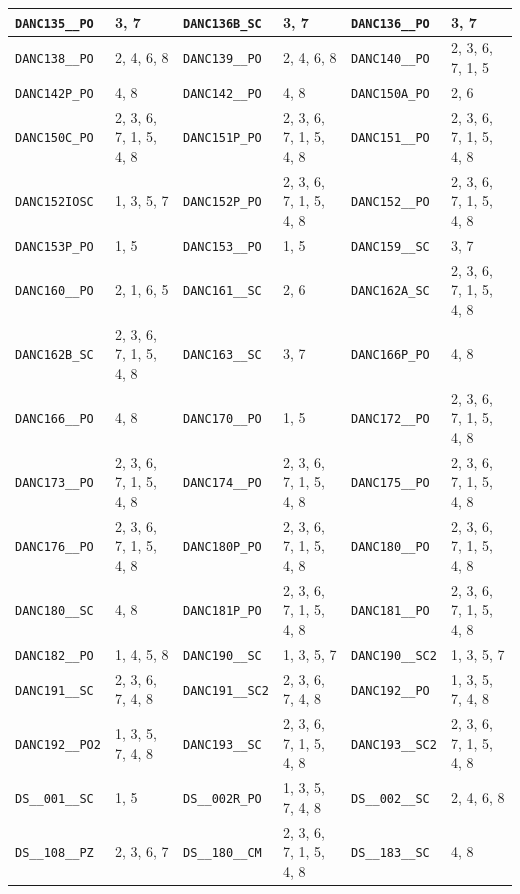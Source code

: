 \begin{longtable}{|l|l||l|l||l|l|}
    \verb|DANC135__PO| & 3, 7 & \verb|DANC136B_SC| & 3, 7 & \verb|DANC136__PO| & 3, 7\\\hline
    \verb|DANC138__PO| & 2, 4, 6, 8 & \verb|DANC139__PO| & 2, 4, 6, 8 & \verb|DANC140__PO| & 2, 3, 6, 7, 1, 5\\\hline
    \verb|DANC142P_PO| & 4, 8 & \verb|DANC142__PO| & 4, 8 & \verb|DANC150A_PO| & 2, 6\\\hline
    \verb|DANC150C_PO| & 2, 3, 6, 7, 1, 5, 4, 8 & \verb|DANC151P_PO| & 2, 3, 6, 7, 1, 5, 4, 8 & \verb|DANC151__PO| & 2, 3, 6, 7, 1, 5, 4, 8\\\hline
    \verb|DANC152IOSC| & 1, 3, 5, 7 & \verb|DANC152P_PO| & 2, 3, 6, 7, 1, 5, 4, 8 & \verb|DANC152__PO| & 2, 3, 6, 7, 1, 5, 4, 8\\\hline
    \verb|DANC153P_PO| & 1, 5 & \verb|DANC153__PO| & 1, 5 & \verb|DANC159__SC| & 3, 7\\\hline
    \verb|DANC160__PO| & 2, 1, 6, 5 & \verb|DANC161__SC| & 2, 6 & \verb|DANC162A_SC| & 2, 3, 6, 7, 1, 5, 4, 8\\\hline
    \verb|DANC162B_SC| & 2, 3, 6, 7, 1, 5, 4, 8 & \verb|DANC163__SC| & 3, 7 & \verb|DANC166P_PO| & 4, 8\\\hline
    \verb|DANC166__PO| & 4, 8 & \verb|DANC170__PO| & 1, 5 & \verb|DANC172__PO| & 2, 3, 6, 7, 1, 5, 4, 8\\\hline
    \verb|DANC173__PO| & 2, 3, 6, 7, 1, 5, 4, 8 & \verb|DANC174__PO| & 2, 3, 6, 7, 1, 5, 4, 8 & \verb|DANC175__PO| & 2, 3, 6, 7, 1, 5, 4, 8\\\hline
    \verb|DANC176__PO| & 2, 3, 6, 7, 1, 5, 4, 8 & \verb|DANC180P_PO| & 2, 3, 6, 7, 1, 5, 4, 8 & \verb|DANC180__PO| & 2, 3, 6, 7, 1, 5, 4, 8\\\hline
    \verb|DANC180__SC| & 4, 8 & \verb|DANC181P_PO| & 2, 3, 6, 7, 1, 5, 4, 8 & \verb|DANC181__PO| & 2, 3, 6, 7, 1, 5, 4, 8\\\hline
    \verb|DANC182__PO| & 1, 4, 5, 8 & \verb|DANC190__SC| & 1, 3, 5, 7 & \verb|DANC190__SC2| & 1, 3, 5, 7\\\hline
    \verb|DANC191__SC| & 2, 3, 6, 7, 4, 8 & \verb|DANC191__SC2| & 2, 3, 6, 7, 4, 8 & \verb|DANC192__PO| & 1, 3, 5, 7, 4, 8\\\hline
    \verb|DANC192__PO2| & 1, 3, 5, 7, 4, 8 & \verb|DANC193__SC| & 2, 3, 6, 7, 1, 5, 4, 8 & \verb|DANC193__SC2| & 2, 3, 6, 7, 1, 5, 4, 8\\\hline
    \verb|DS__001__SC| & 1, 5 & \verb|DS__002R_PO| & 1, 3, 5, 7, 4, 8 & \verb|DS__002__SC| & 2, 4, 6, 8\\\hline
    \verb|DS__108__PZ| & 2, 3, 6, 7 & \verb|DS__180__CM| & 2, 3, 6, 7, 1, 5, 4, 8 & \verb|DS__183__SC| & 4, 8\\\hline

\end{longtable}

